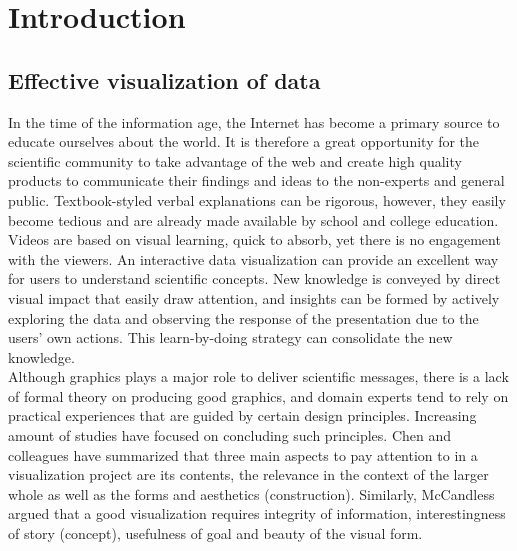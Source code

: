 \documentclass[11pt, a4paper,oneside,chapterprefix=false]{scrbook}
\begin{document}


\tableofcontents

\mainmatter


\chapter{Introduction} \label{chp:introduction}

\section{Effective visualization of data} \label{sec:one}
In the time of the information age, the Internet has become a primary source to educate ourselves about the world. It is therefore a great opportunity for the scientific community to take advantage of the web and create high quality products to communicate their findings and ideas to the non-experts and general public. Textbook-styled verbal explanations can be rigorous, however, they easily become tedious and are already made available by school and college education. Videos are based on visual learning, quick to absorb, yet there is no engagement with the viewers. An interactive data visualization can provide an excellent way for users to understand scientific concepts. New knowledge is conveyed by direct visual impact that easily draw attention, and insights can be formed by actively exploring the data and observing the response of the presentation due to the users' own actions. This learn-by-doing strategy can consolidate the new knowledge. \\

Although graphics plays a major role to deliver scientific messages, there is a lack of formal theory on producing good graphics, and domain experts tend to rely on practical experiences that are guided by certain design principles. Increasing amount of studies have focused on concluding such principles. Chen and colleagues have summarized that three main aspects to pay attention to in a visualization project are its contents, the relevance in the context of the larger whole as well as the forms and aesthetics (construction). Similarly, McCandless argued that a good visualization requires integrity of information, interestingness of story (concept), usefulness of goal and beauty of the visual form.\\
\end{document}
